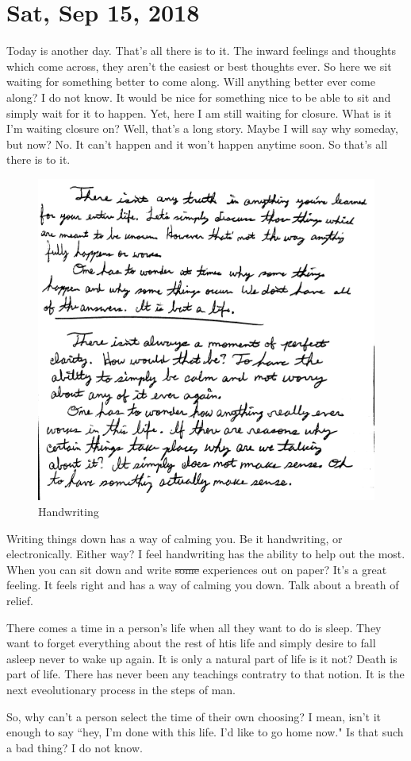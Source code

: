 \section{Sat, Sep 15, 2018}

Today is another day. That's all there is to it. The inward feelings and thoughts
which come across, they aren't the easiest or best thoughts ever. So here we sit
waiting for something better to come along. Will anything better ever come along? I
do not know. It would be nice for something nice to be able to sit and simply wait
for it to happen. Yet, here I am still waiting for closure. What is it I'm waiting
closure on? Well, that's a long story. Maybe I will say why someday, but now? No. It
can't happen and it won't happen anytime soon. So that's all there is to it.

\begin{figure}[h!]
  \centering
  \includegraphics[width=.5\linewidth]{2018/images/handwriting.jpg}
  \caption{Handwriting}
  \label{fig:handwriting}
\end{figure}

Writing things down has a way of calming you. Be it handwriting, or electronically.
Either way? I feel handwriting has the ability to help out the most. When you can sit
down and write \st{some} experiences out on paper? It's a great feeling. It feels
right and has a way of calming you down. Talk about a breath of relief.

There comes a time in a person's life when all they want to do is sleep. They want to
forget everything about the rest of htis life and simply desire to fall asleep never
to wake up again. It is only a natural part of life is it not? Death is part of life.
There has never been any teachings contratry to that notion. It is the next
eveolutionary process in the steps of man.

So, why can't a person select the time of their own choosing? I mean, isn't it enough
to say ``hey, I'm done with this life. I'd like to go home now." Is that such a bad
thing? I do not know.

